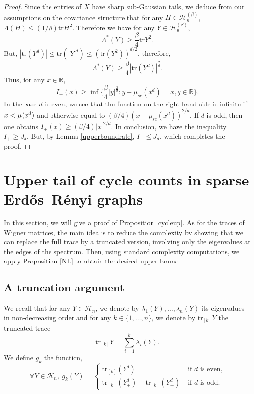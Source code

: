 \documentclass[aop,preprint]{imsart}
\newcommand\RR{\mathbb{R}}
\newcommand\tr{\mathrm{tr}}
\numberwithin{equation}{section}
\theoremstyle{definition}
\theoremstyle{plain}
\theoremstyle{remark}
\begin{document}
\begin{proof}
Since the entries of $X$ have sharp sub-Gaussian tails, we deduce from our assumptions on the covariance structure that for any $H\in \mathcal{H}_n^{(\beta)}$, $\Lambda(H) \leq (1/\beta) \tr H^2$. Therefore we have for any $Y \in \mathcal{H}_n^{(\beta)}$,
$$ \Lambda^*(Y) \geq \frac{\beta}{4} \tr Y^2.$$
But, $| \tr( Y^d) | \leq \tr(|Y|^d) \leq (\tr (Y^2))^{d/2}$, therefore, 
$$ \Lambda^*(Y) \geq \frac{\beta}{4} |\tr (Y^d) |^{\frac{2}{d}}.$$
Thus, for any $x\in\RR$,
$$ I_{+}(x) \geq  \inf \Big\{ \frac{\beta}{4} |y|^{\frac{2}{d}} : y + \mu_{sc}(x^d) = x ,y \in \RR\Big\}.$$ 
In the case $d$ is even, we see that the function on the right-hand side is infinite if $x <\mu_{\sc}(x^d)$ and otherwise equal to $(\beta/4) (x-\mu_{sc}(x^d))^{2/d}$. If $d$ is odd, then one obtains $ I_+(x) \geq (\beta/4) |x|^{2/d}$. In conclusion, we have the inequality $I_+ \geq J_d$. But, by Lemma \ref{upperboundrate}, $I_- \leq  J_d$, which completes the proof.







\end{proof}



\section{Upper tail of cycle counts in sparse  Erd\H{o}s--R\'enyi graphs}

In this section, we will give a proof of Proposition \ref{cycleup}. As for the traces of Wigner matrices, the main idea is to reduce the complexity by showing that we can replace the full trace by a truncated version, involving only the eigenvalues at the edges of the spectrum.  Then, using standard complexity computations, we apply Proposition \ref{NL} to obtain the desired upper bound.
\subsection{A truncation argument}We recall that for any $Y \in \mathcal{H}_n$, we denote by $\lambda_1(Y),\ldots,\lambda_n(Y)$ its eigenvalues in non-decreasing order and for any $k \in \{1,\ldots,n\}$, we denote by $\tr_{[k]} Y$ the truncated trace:
$$ \tr_{[k]} Y = \sum_{i=1}^k \lambda_i(Y).$$
We define $g_k$ the function,
$$\forall Y \in \mathcal{H}_n, \  g_k(Y) = \begin{cases}
\tr_{[k]} (Y^d )& \text{ if  $d$ is even,}\\
\tr_{[k]} (Y_+^d) - \tr_{[k]} (Y_-^d) & \text{ if  $d$ is odd.}
\end{cases}$$ 
\end{document}
